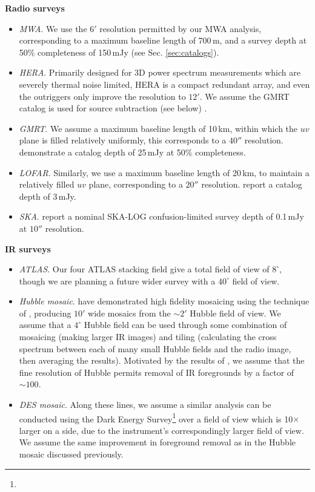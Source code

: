 \documentclass[numberedappendix]{emulateapj}
\begin{document}
\noindent\textbf{Radio surveys}
\begin{itemize}
\item \textit{MWA}. We use the $6'$ resolution permitted by our MWA analysis, corresponding to a maximum baseline length of 700\,m, and a survey depth at 50\% completeness of 150\,mJy (see Sec. \ref{sec:catalogs}).
\item \textit{HERA}. Primarily designed for 3D power spectrum measurements which are severely thermal noise limited, HERA is a compact redundant array, and even the outriggers only improve the resolution to $12'$. We assume the GMRT catalog is used for source subtraction (see below) \citet{deboer16}.
\item \textit{GMRT}. We assume a maximum baseline length of 10\,km, within which the $uv$ plane is filled relatively uniformly, this corresponds to a $40''$ resolution. \citet{intema17} demonstrate a catalog depth of 25\,mJy at 50\% completeness.
\item \textit{LOFAR}. Similarly, we use a maximum baseline length of 20\,km, to maintain a relatively filled $uv$ plane, corresponding to a $20''$ resolution. \citet{lofareorpaper} report a catalog depth of 3\,mJy. 
\item \textit{SKA}. \citet{prandoni15} report a nominal SKA-LOG confusion-limited survey depth of 0.1\,mJy at $10''$ resolution.
\end{itemize}

\noindent\textbf{IR surveys}
\begin{itemize}
\item \textit{ATLAS}. Our four ATLAS stacking field give a total field of view of $8^\circ$, though we are planning a future wider survey with a $40^\circ$ field of view. 
\item \textit{Hubble mosaic}. \citet{mw15} have demonstrated high fidelity mosaicing using the technique of \citet{fixen00}, producing $10'$ wide mosaics from the $\sim2'$ Hubble field of view. We assume that a $4^\circ$ Hubble field can be used through some combination of mosaicing (making larger IR images) and tiling (calculating the cross spectrum between each of many small Hubble fields and the radio image, then averaging the results). Motivated by the results of \citet{mw15}, we assume that the fine resolution of Hubble permits removal of IR foregrounds by a factor of $\sim100$.
\item \textit{DES mosaic}. Along these lines, we assume a similar analysis can be conducted using the Dark Energy Survey\footnote{} over a field of view which is 10$\times$ larger on a side, due to the instrument's correspondingly larger field of view. We assume the same improvement in foreground removal as in the Hubble mosaic discussed previously.
\end{itemize}
\end{document}
